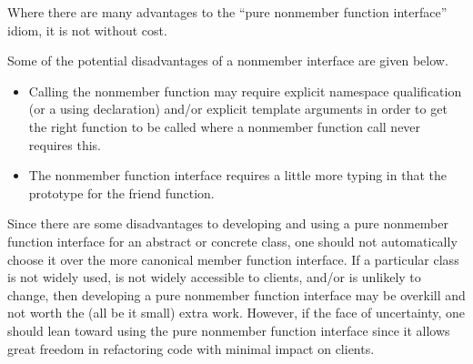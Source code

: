 \documentclass[pdf,ps2pdf,11pt]{SANDreport}
\begin{document}
Where there are many advantages to the ``pure nonmember function interface''
idiom, it is not without cost.

Some of the potential disadvantages of a nonmember interface are given below.

\begin{itemize}

{}\item Calling the nonmember function may require explicit namespace
qualification (or a using declaration) and/or explicit template arguments in
order to get the right function to be called where a nonmember function call
never requires this.

{}\item The nonmember function interface requires a little more typing in that
the prototype for the friend function.

\end{itemize}

Since there are some disadvantages to developing and using a pure nonmember
function interface for an abstract or concrete class, one should not
automatically choose it over the more canonical member function interface.  If
a particular class is not widely used, is not widely accessible to clients,
and/or is unlikely to change, then developing a pure nonmember function
interface may be overkill and not worth the (all be it small) extra work.
However, if the face of uncertainty, one should lean toward using the pure
nonmember function interface since it allows great freedom in refactoring code
with minimal impact on clients.


%
\clearpage



%
%

\end{document}
